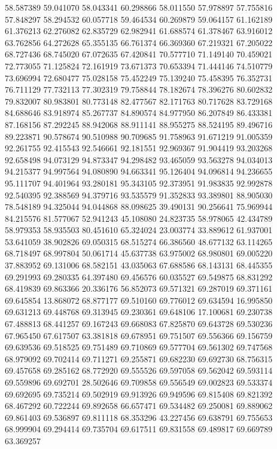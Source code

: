 58.587389
59.041070
58.043341
60.298866
58.011550
57.978897
57.755816
57.848297
58.294532
60.057718
59.464534
60.269879
59.064157
61.162189
61.376213
62.276082
62.835729
62.982941
61.688574
61.378467
63.916012
63.762856
64.272628
65.355135
66.761374
66.369360
67.219321
67.205022
68.727436
68.745020
67.072635
67.420841
70.577710
71.149140
70.459021
72.773055
71.125824
72.161919
73.671373
70.653394
71.444146
74.510779
73.696994
72.680477
75.028158
75.452249
75.139240
75.458395
76.352731
76.711129
77.732113
77.302319
79.758844
78.182674
78.396276
80.602832
79.832007
80.983801
80.773148
82.477567
82.171763
80.717628
83.729168
84.688646
83.918974
85.267737
84.890574
84.977950
86.207849
86.433381
87.168156
87.292245
88.942068
88.911141
88.955275
88.524195
89.496716
89.223871
90.578674
90.510988
90.709685
91.758963
91.671219
91.005359
92.261755
92.415543
92.546661
92.181551
92.969367
91.904419
93.203268
92.658498
94.073129
94.873347
94.298482
93.465059
93.563278
94.034013
94.215377
94.997564
94.080890
94.663341
95.126404
94.096814
94.236655
95.111707
94.401964
93.280181
95.343105
92.373951
91.983835
92.992878
92.540395
92.388569
94.379716
93.535579
91.352833
93.389801
88.905030
78.548189
94.325044
94.044868
88.098625
39.490131
90.256641
75.969944
84.215576
81.577067
52.941243
45.108080
24.823735
58.978065
42.434789
58.979353
58.935503
80.451610
65.324024
23.003774
33.889612
61.937001
53.641059
38.902826
69.050315
68.515274
66.386560
48.677132
63.114265
68.718497
68.997804
50.061714
45.637738
63.975002
68.980801
69.005220
37.883952
69.131006
68.582151
43.035063
67.688586
68.143131
68.445355
69.291993
69.280335
64.397480
69.456576
60.035527
69.549875
68.831292
68.419839
69.863366
20.336176
56.852073
69.571321
69.287019
69.371161
69.645854
13.868072
68.877177
69.510160
69.776012
69.634594
16.995850
69.631213
69.448768
69.313945
69.230361
69.648106
17.100681
69.230738
67.488813
68.441257
69.167243
69.668083
67.825870
69.643728
69.530236
67.965450
67.617507
63.381818
69.678951
69.751507
69.556366
69.156759
69.639536
69.518525
69.751489
69.710869
69.577704
69.561302
69.747568
68.979092
69.702414
69.711271
69.255871
69.682230
69.692730
68.756315
69.457658
69.285162
68.772920
69.555526
69.597058
69.562042
69.593114
69.559896
69.692701
28.502646
69.709858
69.556549
69.002823
69.533374
69.692695
69.735214
69.502919
69.913926
69.949596
69.815408
69.821392
68.467292
60.722244
69.892658
66.657471
69.534482
69.250081
69.889062
69.861403
69.536897
69.811118
68.353296
43.227456
69.638791
69.755653
68.999904
69.294414
69.735704
69.617511
69.831558
69.489817
69.669789
63.369257
